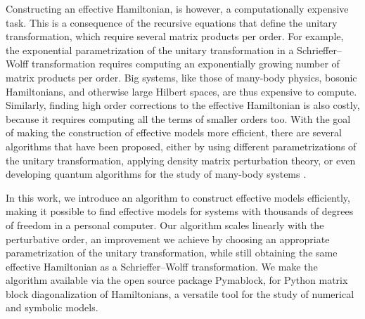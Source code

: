 Constructing an effective Hamiltonian, is however, a computationally expensive
task.
This is a consequence of the recursive equations that define the unitary
transformation, which require several matrix products per order.
For example, the exponential parametrization of the unitary
transformation in a Schrieffer--Wolff transformation requires computing
an exponentially growing number of matrix products per order.
Big systems, like those of many-body physics, bosonic Hamiltonians, and
otherwise large Hilbert spaces, are thus expensive to compute.
Similarly, finding high order corrections to the effective Hamiltonian is
also costly, because it requires computing all the terms of smaller orders too.
With the goal of making the construction of effective models more efficient,
there are several algorithms that have been proposed, either by using different
parametrizations of the unitary transformation, applying density matrix
perturbation theory, or even developing quantum algorithms for the study
of many-body systems \cite{Wurtz_2020, Zhang_2022}.

In this work, we introduce an algorithm to construct effective models
efficiently, making it possible to find effective models for systems with
thousands of degrees of freedom in a personal computer.
Our algorithm scales linearly with the perturbative order, an improvement
we achieve by choosing an appropriate parametrization of the unitary
transformation, while still obtaining the same effective Hamiltonian as
a Schrieffer--Wolff transformation.
We make the algorithm available via the open source package Pymablock, for
Python matrix block diagonalization of Hamiltonians, a versatile tool for
the study of numerical and symbolic models.
